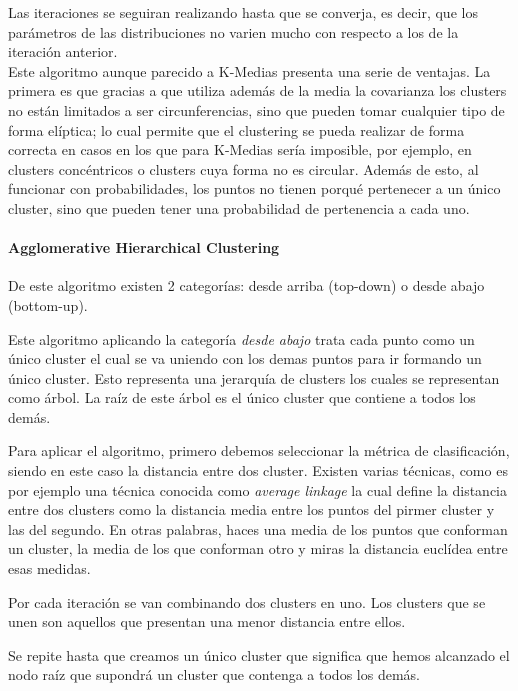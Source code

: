 \documentclass[conference,a4paper]{IEEEtran}
\begin{document}
Las iteraciones se seguiran realizando hasta que se converja, es decir, que los parámetros de las distribuciones no varien mucho con respecto a los de la iteración anterior.\\

Este algoritmo aunque parecido a K-Medias presenta una serie de ventajas. La primera es que gracias a que utiliza además de la media la covarianza los clusters no están limitados a ser circunferencias, sino que pueden tomar cualquier tipo de forma elíptica; lo cual permite que el clustering se pueda realizar de forma correcta en casos en los que para K-Medias sería imposible, por ejemplo, en clusters concéntricos o clusters cuya forma no es circular. Además de esto, al funcionar con probabilidades, los puntos no tienen porqué pertenecer a un único cluster, sino que pueden tener una probabilidad de pertenencia a cada uno.\\

\paragraph{\textbf{Agglomerative Hierarchical Clustering}}

De este algoritmo existen 2 categorías: desde arriba (top-down) o desde abajo (bottom-up).

Este algoritmo aplicando la categoría \textit{desde abajo} trata cada punto como un único cluster el cual se va uniendo con los demas puntos para ir formando un único cluster. Esto representa una jerarquía de clusters los cuales se representan como árbol. La raíz de este árbol es el único cluster que contiene a todos los demás.

Para aplicar el algoritmo, primero debemos seleccionar la métrica de clasificación, siendo en este caso la distancia entre dos cluster. Existen varias técnicas, como es por ejemplo una técnica conocida como \textit{average linkage} la cual define la distancia entre dos clusters como la distancia media entre los puntos del pirmer cluster y las del segundo. En otras palabras, haces una media de los puntos que conforman un cluster, la media de los que conforman otro y miras la distancia euclídea entre esas medidas.

Por cada iteración se van combinando dos clusters en uno. Los clusters que se unen son aquellos que presentan una menor distancia entre ellos.

Se repite hasta que creamos un único cluster que significa que hemos alcanzado el nodo raíz que supondrá un cluster que contenga a todos los demás. 
\end{document}
